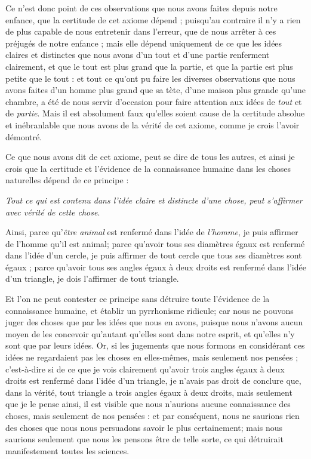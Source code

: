 Ce n'est donc point de ces observations que nous avons faites depuis notre enfance, que la certitude de cet axiome dépend ; puisqu'au contraire il n'y a rien de plus capable de nous entretenir dans l'erreur, que de nous arrêter à ces préjugés de notre enfance ; mais elle dépend uniquement de ce que les idées claires et distinctes que nous avons d'un tout et d'une partie renferment clairement, et que le tout est plus grand que la partie, et que la partie est plus petite que le tout : et tout ce qu'ont pu faire les diverses observations que nous avons faites d'un homme plus grand que sa tète, d'une maison plus grande qu'une chambre, a été de nous servir d'occasion pour faire attention aux idées de \emph{tout} et de \emph{partie}. Mais il est absolument faux qu'elles soient cause de la certitude absolue et inébranlable que nous avons de la vérité de cet axiome, comme je crois l'avoir démontré.

Ce que nous avons dit de cet axiome, peut se dire de tous les autres, et ainsi je crois que la certitude et l'évidence de la connaissance humaine dans les choses naturelles dépend de ce principe :

\begin{center}
\emph{Tout ce qui est contenu dans l'idée claire et distincte d'une chose, peut s'affirmer avec vérité de cette chose}.
\end{center}

Ainsi, parce qu'\emph{être animal} est renfermé dans l'idée de \emph{l'homme}, je puis affirmer de l'homme qu'il est animal; parce qu'avoir tous ses diamètres égaux est renfermé dans l'idée d'un cercle, je puis affirmer de tout cercle que tous ses diamètres sont égaux ; parce qu'avoir tous ses angles égaux à deux droits est renfermé dans l'idée d'un triangle, je dois l'affirmer de tout triangle.

Et l'on ne peut contester ce principe sans détruire toute l'évidence de la connaissance humaine, et établir un pyrrhonisme ridicule; car nous ne pouvons juger des choses que par les idées que nous en avons, puisque nous n'avons aucun moyen de les concevoir qu'autant qu'elles sont dans notre esprit, et qu'elles n'y sont que par leurs idées. Or, si les jugements que nous formons en considérant ces idées ne regardaient pas les choses en elles-mêmes, mais seulement nos pensées ; c'est-à-dire si de ce que je vois clairement qu'avoir trois angles égaux à deux droits est renfermé dans l'idée d'un triangle, je n'avais pas droit de conclure que, dans la vérité, tout triangle a trois angles égaux à deux droits, mais seulement que je le pense ainsi, il est visible que nous n'aurions aucune connaissance des choses, mais seulement de nos pensées : et par conséquent, nous ne saurions rien des choses que nous nous persuadons savoir le plus certainement; mais nous saurions seulement que nous les pensons être de telle sorte, ce qui détruirait manifestement toutes les sciences.

